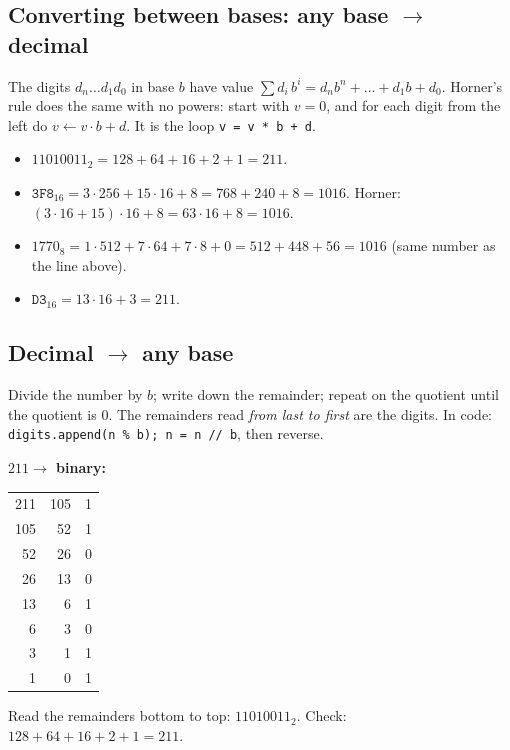 \documentclass{fkt-notes}
\newcommand{\bsub}[2]{#1_{#2}}  %
\begin{document}
\subsection{Converting between bases: any base $\to$ decimal}
\begin{rulebox}[title={Method: positional sum (or Horner's rule)}]
  The digits $d_n\dots d_1d_0$ in base $b$ have value
  $\sum d_i\,b^i=d_nb^n+\dots+d_1b+d_0$.
  Horner's rule does the same with no powers: start with $v=0$, and for each
  digit from the left do $v\leftarrow v\cdot b+d$. It is the loop
  \texttt{v = v * b + d}.
\end{rulebox}
\begin{itemize}
  \item $\bsub{11010011}{2}=128+64+16+2+1=211$.
  \item $\bsub{\texttt{3F8}}{16}=3\cdot256+15\cdot16+8=768+240+8=1016$.
        Horner: $(3\cdot16+15)\cdot16+8=63\cdot16+8=1016$.
  \item $\bsub{1770}{8}=1\cdot512+7\cdot64+7\cdot8+0=512+448+56=1016$ (same number as the line above).
  \item $\bsub{\texttt{D3}}{16}=13\cdot16+3=211$.
\end{itemize}

\subsection{Decimal $\to$ any base}
\begin{rulebox}[title={Method: repeated division (whole numbers)}]
  Divide the number by $b$; write down the remainder; repeat on the quotient
  until the quotient is 0. The remainders read \emph{from last to first} are the digits.
  In code: \texttt{digits.append(n \% b); n = n // b}, then reverse.
\end{rulebox}
\noindent\textbf{$211\to$ binary:}
\begin{center}\small\renewcommand{\arraystretch}{1.05}
  \begin{tabular}{@{}r@{ $\div2=$ }r@{ remainder }l@{}}
    211 & 105 & 1 \\ 105 & 52 & 1 \\ 52 & 26 & 0 \\ 26 & 13 & 0 \\
    13 & 6 & 1 \\ 6 & 3 & 0 \\ 3 & 1 & 1 \\ 1 & 0 & 1
  \end{tabular}
\end{center}
Read the remainders bottom to top: $\bsub{11010011}{2}$. Check: $128+64+16+2+1=211$. \checkmark
\end{document}
